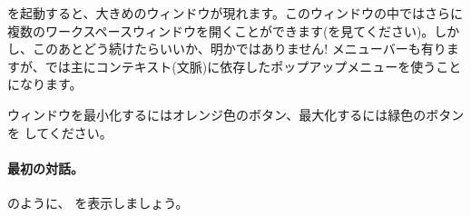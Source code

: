 \documentclass[a4paper,10pt,twoside]{book}
\begin{document}
\pharo を起動すると、大きめのウィンドウが現れます。このウィンドウの中ではさらに複数のワークスペースウィンドウを開くことができます(を見てください)。しかし、このあとどう続けたらいいか、明かではありません!
メニューバーも有りますが、\pharo では主にコンテキスト(文脈)に依存したポップアップメニューを使うことになります。


ウィンドウを最小化するにはオレンジ色のボタン、最大化するには緑色のボタンを \click してください。

\paragraph{最初の対話。}

 のように、 を表示しましょう。


\end{document}
